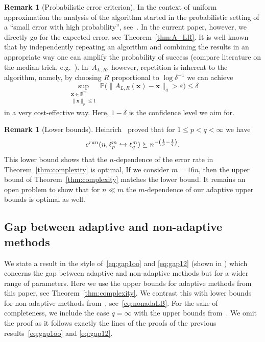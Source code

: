 \documentclass[12pt]{article}
\theoremstyle{plain}
\theoremstyle{definition}
\newtheorem{remark}[theorem]{Remark}
\renewcommand{\P}{{\mathbb P}}
\newcommand{\ran}{\textup{ran}}
\newcommand{\eps}{\varepsilon}
\newcommand{\embed}{\hookrightarrow}
\renewcommand{\vec}{\boldsymbol}
\newcommand{\R}{{\mathbb R}}
\begin{document}
\begin{remark}[Probabilistic error criterion]
    In the context of uniform approximation the analysis of the algorithm started
    in the probabilistic setting of a ``small error with high probability'',
    see~\cite[Thm~3.1]{KW24b}.
    In the current paper, however, we directly go for the expected error, see Theorem~\ref{thm:A_LR}.
    It is well known that by independently repeating an algorithm and combining the results in an appropriate way one can amplify the probability of success
    (compare literature on the median trick, e.g.~\cite{NP09}).
    In~$A_{L,R}$, however, repetition is inherent to the algorithm,
    namely, by choosing $R$ proportional to $\log \delta^{-1}$ we can achieve
    \begin{equation*}
        \sup_{\substack{\vec{x} \in \R^m \\ \|\vec{x}\|_p \leq 1}}
            \P\bigl( \|A_{L,R}(\vec{x}) - \vec{x} \|_q > \eps \bigr) \leq \delta
    \end{equation*}
    in a very cost-effective way.
    Here, $1-\delta$ is the confidence level we aim for.
\end{remark}


\begin{remark}[Lower bounds]
    Heinrich~\cite{H92} proved that for $1 \leq p < q < \infty$ we have
    \begin{equation*}
        e^{\ran}(n,\ell_p^m \embed \ell_q^m)
            \succeq n^{-\left(\frac{1}{p} - \frac{1}{q}\right)}.
    \end{equation*}
    This lower bound shows that the $n$-dependence of the error rate in Theorem~\ref{thm:complexity} is optimal,
    If we consider $m = 16n$, then the upper bound of Theorem~\ref{thm:complexity} matches the lower bound.
    It remains an open problem to show that for $n \ll m$
    the $m$-dependence of our adaptive upper bounds is optimal as well.
\end{remark}



\subsection{Gap between adaptive and non-adaptive methods}

We state a result in the style of~\eqref{eq:gap1oo} and \eqref{eq:gap12}
(shown in \cite{KNW24,KW24b}) 
which concerns the gap between adaptive and non-adaptive methods
but for a wider range of parameters.
Here we use the upper bounds for adaptive methods from this paper, see Theorem~\ref{thm:complexity}.
We contrast this with lower bounds for non-adaptive methods from~\cite{KNW24}, see~\eqref{eq:nonadaLB}.
For the sake of completeness,
we include the case $q=\infty$ with the upper bounds from~\cite[Thm~3.3]{KW24b}.
We omit the proof as it follows exactly the lines of the proofs of the previous results~\eqref{eq:gap1oo} and \eqref{eq:gap12}.
\end{document}
